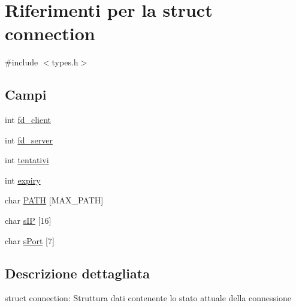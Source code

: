 \hypertarget{structconnection}{
\section{Riferimenti per la struct connection}
\label{structconnection}
}


{\ttfamily \#include $<$types.h$>$}

\subsection*{Campi}
{\bf }\par
\begin{DoxyCompactItemize}
\item 
int \hyperlink{structconnection_a5bb81a57f0db72ea26bfa85b3ead6653}{fd\_\-client}
\item 
int \hyperlink{structconnection_a2906fb676dd78cf78ff63f6ac1c7f1d0}{fd\_\-server}
\item 
int \hyperlink{structconnection_a7567ce596b311e606b465e0f2fbf17b6}{tentativi}
\item 
int \hyperlink{structconnection_a8336ba2f653330fe728b52edd7d6d2b3}{expiry}
\item 
char \hyperlink{structconnection_abe305d592cdaa7b373988774c0eebfe0}{PATH} \mbox{[}MAX\_\-PATH\mbox{]}
\item 
char \hyperlink{structconnection_a3939675d1ec7045c864a2df3bf5f8e7e}{sIP} \mbox{[}16\mbox{]}
\item 
char \hyperlink{structconnection_a9ee6aa71d1fe23b32954f2d6383d04a0}{sPort} \mbox{[}7\mbox{]}
\end{DoxyCompactItemize}



\subsection{Descrizione dettagliata}
struct connection: Struttura dati contenente lo stato attuale della connessione 

